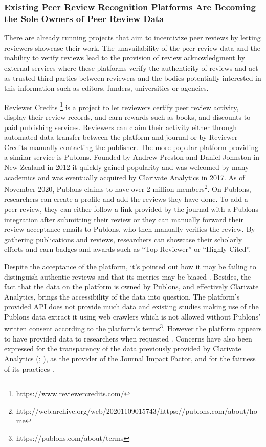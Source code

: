 \subsubsection{Existing Peer Review Recognition Platforms Are Becoming the Sole Owners of Peer Review Data}

There are already running projects that aim to incentivize peer reviews by letting reviewers showcase their work. The unavailability of the peer review data and the inability to verify reviews lead to the provision of review acknowledgment by external services where these platforms verify the authenticity of reviews and act as trusted third parties between reviewers and the bodies potentially interested in this information such as editors, funders, universities or agencies.

Reviewer Credits \footnote{https://www.reviewercredits.com/}  is a project to let reviewers certify peer review activity, display their review records, and earn rewards such as books, and discounts to paid publishing services. Reviewers can claim their activity either through automated data transfer between the platform and journal or by Reviewer Credits manually contacting the publisher. The more popular platform providing a similar service is Publons. Founded by Andrew Preston and Daniel Johnston in New Zealand in 2012 it quickly gained popularity and was welcomed by many academics \parencite[266]{Smith.2015} and was eventually acquired by Clarivate Analytics in 2017. As of November 2020, Publons claims to have over 2 million members\footnote{http://web.archive.org/web/20201109015743/https://publons.com/about/home}. On Publons, researchers can create a profile and add the reviews they have done. To add a peer review, they can either follow a link provided by the journal with a Publons integration after submitting their review or they can manually forward their review acceptance emails to Publons, who then manually verifies the review. By gathering publications and reviews, researchers can showcase their scholarly efforts and earn badges and awards such as “Top Reviewer” or “Highly Cited”. 

Despite the acceptance of the platform, it’s pointed out how it may be failing to distinguish authentic reviews \parencite{TeixeiradaSilva.2020} and that its metrics may be biased \parencite{Ortega.2017}. Besides, the fact that the data on the platform is owned by Publons, and effectively Clarivate Analytics, brings the accessibility of the data into question. The platform’s provided API does not provide much data and existing studies making use of the Publons data extract it using web crawlers \parencite[952]{Ortega.2017} which is not allowed without Publons’ written consent according to the platform’s terms\footnote{https://publons.com/about/terms}. However the platform appears to have provided data to researchers when requested \parencite[12]{Kovanis.2016}. Concerns have also been expressed for the transparency of the data previously provided by Clarivate Analytics (\cite{Rossner.2007}; \cite[3]{TeixeiradaSilva.2019}), as the provider of the Journal Impact Factor, and for the fairness of its practices \parencite{TeixeiradaSilva.2013}.

